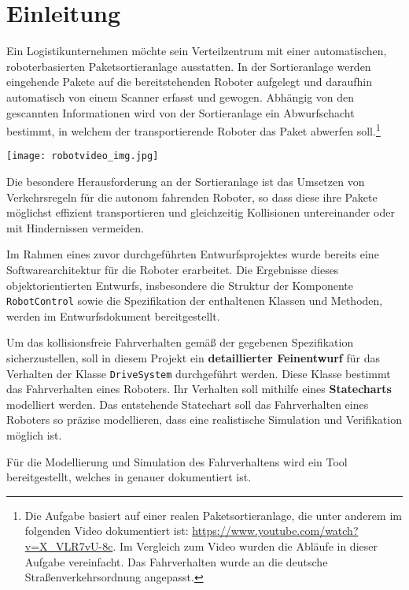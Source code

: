 
\section{Einleitung}

Ein Logistikunternehmen möchte sein Verteilzentrum mit einer automatischen, roboterbasierten Paketsortieranlage ausstatten.
In der Sortieranlage werden eingehende Pakete auf die bereitstehenden Roboter aufgelegt und daraufhin automatisch von einem Scanner erfasst und gewogen.
Abhängig von den gescannten Informationen wird von der Sortieranlage ein Abwurfschacht bestimmt, in welchem der transportierende Roboter das Paket abwerfen soll.\footnote{Die Aufgabe basiert auf einer realen Paketsortieranlage, die unter anderem im folgenden Video dokumentiert ist: \url{https://www.youtube.com/watch?v=X_VLR7vU-8c}. Im Vergleich zum Video wurden die Abläufe in dieser Aufgabe vereinfacht. 
Das Fahrverhalten wurde an die deutsche Straßenverkehrsordnung angepasst.}

\begin{center}
	\texttt{[image: robotvideo\_img.jpg]}
\end{center}

Die besondere Herausforderung an der Sortieranlage ist das Umsetzen von Verkehrsregeln für die autonom fahrenden Roboter, so dass diese ihre Pakete möglichst effizient transportieren und gleichzeitig Kollisionen untereinander oder mit Hindernissen vermeiden.

Im Rahmen eines zuvor durchgeführten Entwurfsprojektes wurde bereits eine Softwarearchitektur für die Roboter erarbeitet. Die Ergebnisse dieses objektorientierten Entwurfs, insbesondere die Struktur der Komponente \texttt{RobotControl} sowie die Spezifikation der enthaltenen Klassen und Methoden, werden im Entwurfsdokument \texttt{} bereitgestellt.

Um das kollisionsfreie Fahrverhalten gemäß der gegebenen Spezifikation sicherzustellen, soll in diesem Projekt ein \textbf{detaillierter Feinentwurf} für das Verhalten der Klasse \texttt{DriveSystem} durchgeführt werden.
Diese Klasse bestimmt das Fahrverhalten eines Roboters. Ihr Verhalten soll mithilfe eines \textbf{Statecharts} modelliert werden.
Das entstehende Statechart soll das Fahrverhalten eines Roboters so präzise modellieren, dass eine realistische Simulation und  Verifikation möglich ist.

Für die Modellierung und Simulation des Fahrverhaltens wird ein Tool bereitgestellt, welches in \texttt{} genauer dokumentiert ist.

